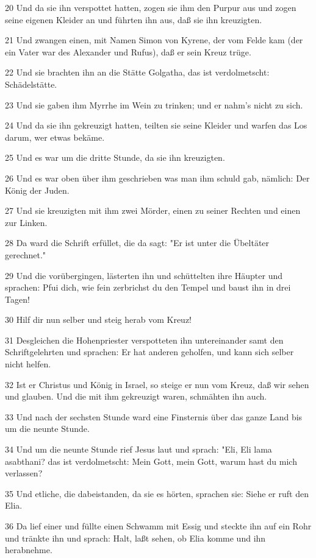 \par 20 Und da sie ihn verspottet hatten, zogen sie ihm den Purpur aus und zogen seine eigenen Kleider an und führten ihn aus, daß sie ihn kreuzigten.
\par 21 Und zwangen einen, mit Namen Simon von Kyrene, der vom Felde kam (der ein Vater war des Alexander und Rufus), daß er sein Kreuz trüge.
\par 22 Und sie brachten ihn an die Stätte Golgatha, das ist verdolmetscht: Schädelstätte.
\par 23 Und sie gaben ihm Myrrhe im Wein zu trinken; und er nahm's nicht zu sich.
\par 24 Und da sie ihn gekreuzigt hatten, teilten sie seine Kleider und warfen das Los darum, wer etwas bekäme.
\par 25 Und es war um die dritte Stunde, da sie ihn kreuzigten.
\par 26 Und es war oben über ihm geschrieben was man ihm schuld gab, nämlich: Der König der Juden.
\par 27 Und sie kreuzigten mit ihm zwei Mörder, einen zu seiner Rechten und einen zur Linken.
\par 28 Da ward die Schrift erfüllet, die da sagt: "Er ist unter die Übeltäter gerechnet."
\par 29 Und die vorübergingen, lästerten ihn und schüttelten ihre Häupter und sprachen: Pfui dich, wie fein zerbrichst du den Tempel und baust ihn in drei Tagen!
\par 30 Hilf dir nun selber und steig herab vom Kreuz!
\par 31 Desgleichen die Hohenpriester verspotteten ihn untereinander samt den Schriftgelehrten und sprachen: Er hat anderen geholfen, und kann sich selber nicht helfen.
\par 32 Ist er Christus und König in Israel, so steige er nun vom Kreuz, daß wir sehen und glauben. Und die mit ihm gekreuzigt waren, schmähten ihn auch.
\par 33 Und nach der sechsten Stunde ward eine Finsternis über das ganze Land bis um die neunte Stunde.
\par 34 Und um die neunte Stunde rief Jesus laut und sprach: "Eli, Eli lama asabthani? das ist verdolmetscht: Mein Gott, mein Gott, warum hast du mich verlassen?
\par 35 Und etliche, die dabeistanden, da sie es hörten, sprachen sie: Siehe er ruft den Elia.
\par 36 Da lief einer und füllte einen Schwamm mit Essig und steckte ihn auf ein Rohr und tränkte ihn und sprach: Halt, laßt sehen, ob Elia komme und ihn herabnehme.
